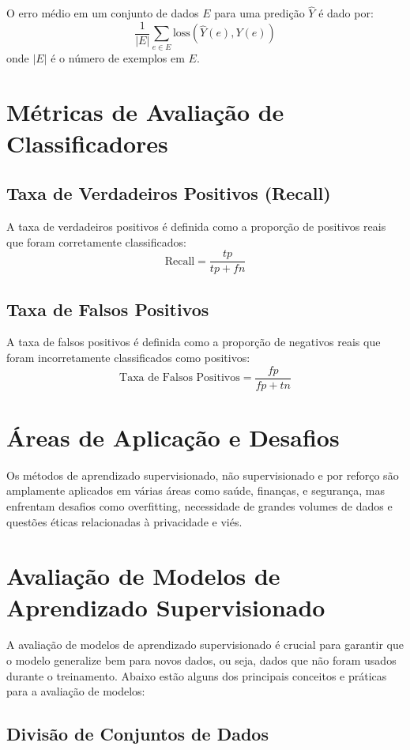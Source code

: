 \documentclass{article}
\begin{document}
O erro médio em um conjunto de dados $E$ para uma predição $\hat{Y}$ é dado por:
\[
\frac{1}{|E|} \sum_{e \in E} \text{loss}(\hat{Y}(e), Y(e))
\]
onde $|E|$ é o número de exemplos em $E$.

\section{Métricas de Avaliação de Classificadores}

\subsection{Taxa de Verdadeiros Positivos (Recall)}
A taxa de verdadeiros positivos é definida como a proporção de positivos reais que foram corretamente classificados:
\[
\text{Recall} = \frac{tp}{tp + fn}
\]

\subsection{Taxa de Falsos Positivos}
A taxa de falsos positivos é definida como a proporção de negativos reais que foram incorretamente classificados como positivos:
\[
\text{Taxa de Falsos Positivos} = \frac{fp}{fp + tn}
\]

\section{Áreas de Aplicação e Desafios}

Os métodos de aprendizado supervisionado, não supervisionado e por reforço são amplamente aplicados em várias áreas como saúde, finanças, e segurança, mas enfrentam desafios como overfitting, necessidade de grandes volumes de dados e questões éticas relacionadas à privacidade e viés.

\section{Avaliação de Modelos de Aprendizado Supervisionado}

A avaliação de modelos de aprendizado supervisionado é crucial para garantir que o modelo generalize bem para novos dados, ou seja, dados que não foram usados durante o treinamento. Abaixo estão alguns dos principais conceitos e práticas para a avaliação de modelos:

\subsection{Divisão de Conjuntos de Dados}
\end{document}
